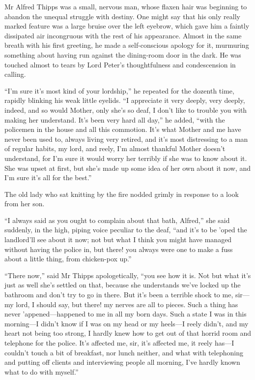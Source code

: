 Mr Alfred Thipps was a small, nervous man, whose flaxen hair was beginning to abandon the unequal struggle with destiny. One might say that his only really marked feature was a large bruise over the left eyebrow, which gave him a faintly dissipated air incongruous with the rest of his appearance. Almost in the same breath with his first greeting, he made a self-conscious apology for it, murmuring something about having run against the dining-room door in the dark. He was touched almost to tears by Lord Peter’s thoughtfulness and condescension in calling.

\enquote{I’m sure it’s most kind of your lordship,} he repeated for the dozenth time, rapidly blinking his weak little eyelids. \enquote{I appreciate it very deeply, very deeply, indeed, and so would Mother, only she’s so deaf, I don’t like to trouble you with making her understand. It’s been very hard all day,} he added, \enquote{with the policemen in the house and all this commotion. It’s what Mother and me have never been used to, always living very retired, and it’s most distressing to a man of regular habits, my lord, and reely, I’m almost thankful Mother doesn’t understand, for I’m sure it would worry her terribly if she was to know about it. She was upset at first, but she’s made up some idea of her own about it now, and I’m sure it’s all for the best.}

The old lady who sat knitting by the fire nodded grimly in response to a look from her son.

\enquote{I always said as you ought to complain about that bath, Alfred,} she said suddenly, in the high, piping voice peculiar to the deaf, \enquote{and it’s to be ’oped the landlord’ll see about it now; not but what I think you might have managed without having the police in, but there! you always were one to make a fuss about a little thing, from chicken-pox up.}

\enquote{There now,} said Mr Thipps apologetically, \enquote{you see how it is. Not but what it’s just as well she’s settled on that, because she understands we’ve locked up the bathroom and don’t try to go in there. But it’s been a terrible shock to me, sir\allowbreak---\allowbreak my lord, I should say, but there! my nerves are all to pieces. Such a thing has never ’appened\allowbreak---\allowbreak happened to me in all my born days. Such a state I was in this morning\allowbreak---\allowbreak I didn’t know if I was on my head or my heels\allowbreak---\allowbreak I reely didn’t, and my heart not being too strong, I hardly knew how to get out of that horrid room and telephone for the police. It’s affected me, sir, it’s affected me, it reely has\allowbreak---\allowbreak I couldn’t touch a bit of breakfast, nor lunch neither, and what with telephoning and putting off clients and interviewing people all morning, I’ve hardly known what to do with myself.}

